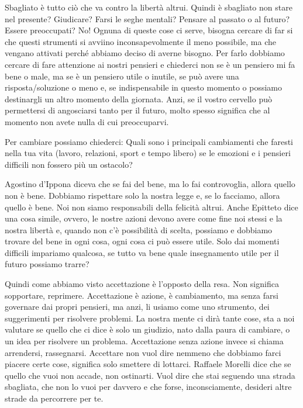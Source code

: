 \documentclass[12pt]{book} %
\begin{document}
Sbagliato è tutto ciò che va contro la libertà altrui. Quindi è sbagliato non stare
nel presente? Giudicare? Farsi le seghe mentali? Pensare al passato o al futuro? Essere preoccupati? No! Ognuna di
queste cose ci serve, bisogna cercare di far si che questi strumenti si avviino inconsapevolmente il meno possibile, ma che
vengano attivati perché abbiamo deciso di averne bisogno. Per farlo dobbiamo cercare di fare attenzione ai nostri
pensieri e chiederci non se è un pensiero mi fa bene o male, ma se è un pensiero utile o inutile, se può avere una
risposta/soluzione o meno e, se indispensabile in questo momento o possiamo destinargli un altro momento della
giornata. Anzi, se il vostro cervello può permettersi di angosciarsi tanto per il futuro, molto spesso significa che al
momento non avete nulla di cui preoccuparvi.

Per cambiare possiamo chiederci: Quali sono i principali cambiamenti che faresti nella tua vita (lavoro, relazioni,
sport e tempo libero) se le emozioni e i pensieri difficili non fossero più un ostacolo?

Agostino d'Ippona diceva che se fai del bene, ma lo fai controvoglia, allora quello non è bene. Dobbiamo rispettare solo
la nostra legge e, se lo facciamo, allora quello è bene. Noi non siamo responsabili della felicità altrui. Anche
Epitteto dice una cosa simile, ovvero, le nostre azioni devono avere come fine noi stessi e la nostra libertà e, quando
non c'è possibilità di scelta, possiamo e dobbiamo trovare del bene in ogni cosa, ogni cosa ci può
essere utile. Solo dai momenti difficili impariamo qualcosa, se tutto va bene quale insegnamento utile per il futuro
possiamo trarre?

Quindi come abbiamo visto accettazione è l'opposto della resa. Non significa sopportare, reprimere.
Accettazione è azione, è cambiamento, ma senza farsi governare dai propri pensieri, ma anzi, li usiamo come uno
strumento, dei suggerimenti per risolvere problemi. La nostra mente ci dirà tante cose, sta a noi valutare se quello
che ci dice è solo un giudizio, nato dalla paura di cambiare, o un idea per risolvere un problema. Accettazione senza
azione invece si chiama arrendersi, rassegnarsi. Accettare non vuol dire nemmeno che dobbiamo farci piacere certe cose,
significa solo smettere di lottarci.
Raffaele Morelli dice che se quello che vuoi non accade, non ostinarti. Vuol dire che stai seguendo una strada sbagliata, che non lo vuoi per davvero e che forse, inconsciamente, desideri altre strade da percorrere per te. 
\end{document}
